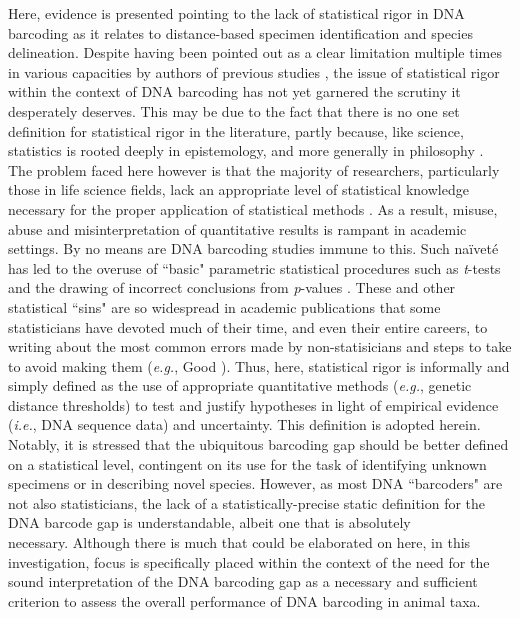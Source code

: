 Here, evidence is presented pointing to the lack of statistical rigor in DNA barcoding as it relates to distance-based specimen identification and species delineation. Despite having been pointed out as a clear limitation multiple times in various capacities by authors of previous studies \cite{luo2015simulation, matz2005likelihood, nielsen2006statistical, phillips2019incomplete}, the issue of statistical rigor within the context of DNA barcoding has not yet garnered the scrutiny it desperately deserves.  This may be due to the fact that there is no one set definition for statistical rigor in the literature, partly because, like science, statistics is rooted deeply in epistemology, and more generally in philosophy \cite{lindley2000philosophy}. The problem faced here however is that the majority of researchers, particularly those in life science fields, lack an appropriate level of statistical knowledge necessary for the proper application of statistical methods \cite{fieberg2020resampling}. As a result, misuse, abuse and misinterpretation of quantitative results is rampant in academic settings. By no means are DNA barcoding studies immune to this. Such na{\"i}vet{\'e} has led to the overuse of ``basic" parametric statistical procedures such as \textit{t}-tests and the drawing of incorrect conclusions from \textit{p}-values \cite{wasserstein2019moving}. These and other statistical ``sins" are so widespread in academic publications that some statisticians have devoted much of their time, and even their entire careers, to writing about the most common errors made by non-statisicians and steps to take to avoid making them (\textit{e.g.}, Good \cite{good2003common}). Thus, here, statistical rigor is informally and simply defined as the use of appropriate quantitative methods (\textit{e.g.}, genetic distance thresholds) to test and justify hypotheses in light of empirical evidence (\textit{i.e.}, DNA sequence data) and uncertainty. This definition is adopted herein. Notably, it is stressed that the ubiquitous barcoding gap should be better defined on a statistical level, contingent on its use for the task of identifying unknown specimens or in describing novel species. However, as most DNA ``barcoders" are not also statisticians, the lack of a statistically-precise static definition for the DNA barcode gap is understandable, albeit one that is absolutely \\ necessary. Although there is much that could be elaborated on here, in this investigation, focus is specifically placed within the context of the need for the sound interpretation of the DNA barcoding gap as a necessary and sufficient criterion to assess the overall performance of DNA barcoding in animal taxa.



